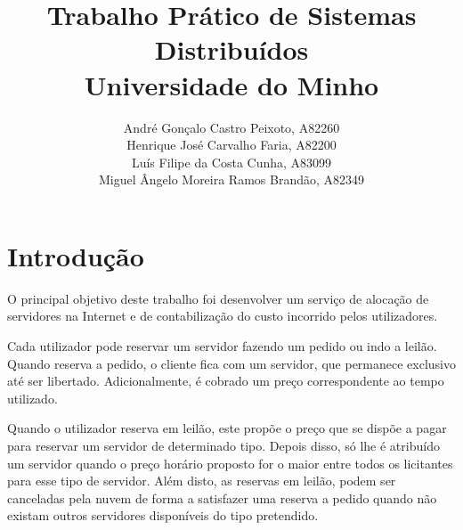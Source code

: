 \documentclass[11pt]{article}
\title{
    \Large{Trabalho Prático de Sistemas Distribuídos} \\
    \Large{Universidade do Minho}
    \vspace{-10pt}}
\author{\small André Gonçalo Castro Peixoto, A82260\\
        \small Henrique José Carvalho Faria, A82200\\
        \small Luís Filipe da Costa Cunha, A83099\\
        \small Miguel Ângelo Moreira Ramos Brandão, A82349
        \vspace{-20pt}}
\date{}
\begin{document}

\setlength{\droptitle}{-60pt}
\maketitle



\section{Introdução}

O principal objetivo deste trabalho foi desenvolver um serviço de alocação de servidores na Internet e de contabilização do custo incorrido pelos utilizadores.

Cada utilizador pode reservar um servidor fazendo um pedido ou indo a leilão. Quando reserva a pedido, o cliente fica com um servidor, que permanece exclusivo até ser libertado. Adicionalmente, é cobrado um preço correspondente ao tempo utilizado.

Quando o utilizador reserva em leilão, este propõe o preço que se dispõe a pagar para reservar um servidor de determinado tipo. Depois disso, só lhe é atribuído um servidor quando o preço horário proposto for o maior entre todos os licitantes para esse tipo de servidor. Além disto, as reservas em leilão, podem ser canceladas pela nuvem de forma a satisfazer uma reserva a pedido quando não existam outros servidores disponíveis do tipo pretendido.
\end{document}
